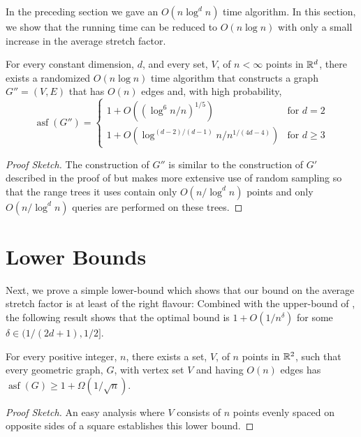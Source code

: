 \documentclass{patmorin}
\DeclareMathOperator{\asf}{asf}
\begin{document}
In the preceding section we gave an $O(n\log^d n)$ time algorithm.
In this section, we show that the running time can be reduced to $O(n\log
n)$ with only a small increase in the average stretch factor.

\begin{thm}
  For every constant dimension, $d$, and every set, $V$, of $n<\infty$
  points in $\mathbb{R}^d$, there exists a randomized $O(n\log n)$ time
  algorithm that constructs a graph $G''=(V,E)$ that has $O(n)$ edges
  and, with high probability, 
  \[
      \asf(G'')=\begin{cases}
         1+ O((\log^{6} n/n)^{1/5}) & \text{for $d=2$} \\
         1+ O(\log^{(d-2)/(d-1)}n/n^{1/(4d-4)}) 
                  & \text{for $d\ge 3$} 
      \end{cases}
  \]
\end{thm}

\begin{proof}[Proof Sketch]
  The construction of $G''$ is similar to the construction of $G'$
  described in the proof of  but makes more extensive
  use of random sampling so that the range trees it uses contain only
  $O(n/\log^d n)$ points and only $O(n/\log^d n)$ queries are performed on
  these trees.
\end{proof}



\section{Lower Bounds}

Next, we prove a simple lower-bound which shows that our bound on the
average stretch factor is at least of the right flavour: Combined with
the upper-bound of , the following result shows that
the optimal bound is $1+O(1/n^{\delta})$ for some $\delta\in(1/(2d+1),1/2]$.

\begin{thm}
  For every positive integer, $n$, there exists a set, $V$, of $n$
  points in $\mathbb{R}^2$, such that every geometric graph, $G$, with vertex
  set $V$ and having $O(n)$ edges has $\asf(G)\ge 1 + \Omega(1/\sqrt{n})$.
\end{thm}

\begin{proof}[Proof Sketch]
  An easy analysis where $V$ consists of $n$ points evenly spaced on
  opposite sides of a square establishes this lower bound.
\end{proof}
\end{document}
